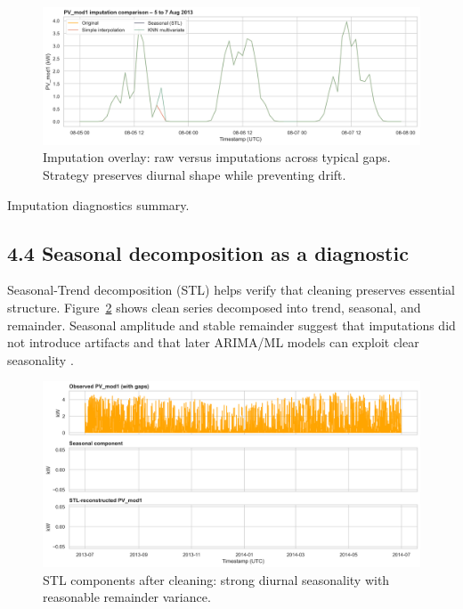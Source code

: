 \documentclass[12pt,a4paper]{article}
\begin{document}
\begin{figure}[H]
  \centering
  \includegraphics[width=0.95\linewidth]{task4_fig_imputation_overlay.png}
  \caption{Imputation overlay: raw versus imputations across typical gaps. Strategy preserves diurnal shape while preventing drift.}
  \label{fig:task4_imputation_overlay}
\end{figure}

\begin{table}[H]
  \centering
  \caption{Imputation diagnostics summary.}
  \label{tab:task4_imputation_summary}
\end{table}

\subsection*{4.4 Seasonal decomposition as a diagnostic}
Seasonal-Trend decomposition (STL) helps verify that cleaning preserves essential structure. Figure~\ref{fig:task4_stl} shows clean series decomposed into trend, seasonal, and remainder. Seasonal amplitude and stable remainder suggest that imputations did not introduce artifacts and that later ARIMA/ML models can exploit clear seasonality \cite{Hyndman2021}.

\begin{figure}[H]
  \centering
  \includegraphics[width=0.95\linewidth]{task4_fig_stl_components.png}
  \caption{STL components after cleaning: strong diurnal seasonality with reasonable remainder variance.}
  \label{fig:task4_stl}
\end{figure}
\end{document}
